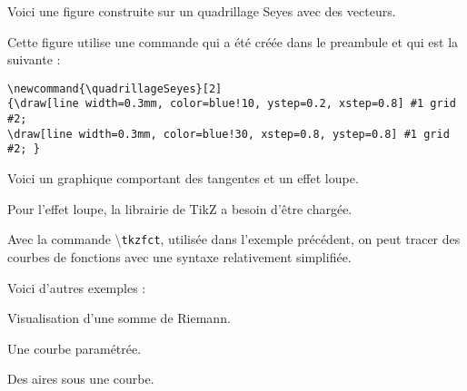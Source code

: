 
\medskip

\medskip

Voici une figure construite sur un quadrillage Seyes avec des vecteurs.

Cette figure utilise une commande qui a été créée dans le preambule et qui est la suivante :

\begin{verbatim}
\newcommand{\quadrillageSeyes}[2]
{\draw[line width=0.3mm, color=blue!10, ystep=0.2, xstep=0.8] #1 grid #2;
\draw[line width=0.3mm, color=blue!30, xstep=0.8, ystep=0.8] #1 grid #2; }
\end{verbatim}


\medskip

\medskip


Voici un graphique comportant des tangentes et un effet loupe.

Pour l'effet loupe, la librairie  de TikZ a besoin d'être chargée.


\medskip

\medskip

\begin{info}
Avec la commande \textbackslash\verb!tkzfct!, utilisée dans l'exemple précédent, on peut tracer des courbes de fonctions avec une syntaxe relativement simplifiée.
\end{info}

Voici d'autres exemples :


\medskip

\medskip

Visualisation d'une somme de Riemann.


\medskip

\medskip

Une courbe paramétrée.


\medskip

\medskip

Des aires sous une courbe.


\medskip


